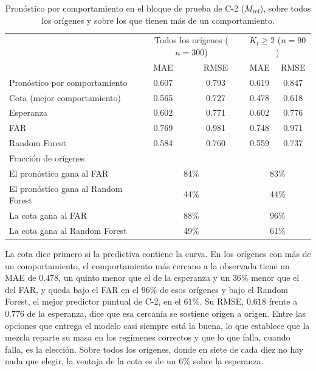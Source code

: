 \begin{table}[H]
\centering\footnotesize
\caption{Pronóstico por comportamiento en el bloque de prueba de C-2 ($M_{\mathrm{ref}}$), sobre todos los orígenes y sobre los que tienen más de un comportamiento.}
\label{tab:res_pronostico}
\begin{tabular}{l cc cc}
\hline
 & \multicolumn{2}{c}{Todos los orígenes ($n = 300$)} & \multicolumn{2}{c}{$K_t \ge 2$ ($n = 90$)} \\
 & MAE & RMSE & MAE & RMSE \\
\hline
Pronóstico por comportamiento  & 0.607 & 0.793 & 0.619 & 0.847 \\
Cota (mejor comportamiento)    & 0.565 & 0.727 & 0.478 & 0.618 \\
Esperanza                      & 0.602 & 0.771 & 0.602 & 0.776 \\
FAR                            & 0.769 & 0.981 & 0.748 & 0.971 \\
Random Forest                  & 0.584 & 0.760 & 0.559 & 0.737 \\
\hline
\multicolumn{5}{l}{Fracción de orígenes} \\
El pronóstico gana al FAR            & \multicolumn{2}{c}{84\%} & \multicolumn{2}{c}{83\%} \\
El pronóstico gana al Random Forest  & \multicolumn{2}{c}{44\%} & \multicolumn{2}{c}{44\%} \\
La cota gana al FAR                  & \multicolumn{2}{c}{88\%} & \multicolumn{2}{c}{96\%} \\
La cota gana al Random Forest        & \multicolumn{2}{c}{49\%} & \multicolumn{2}{c}{61\%} \\
\hline
\end{tabular}
\end{table}

La cota dice primero si la predictiva contiene la curva. En los orígenes con más de un comportamiento, el comportamiento más cercano a la observada tiene un MAE de $0.478$, un quinto menor que el de la esperanza y un $36\%$ menor que el del FAR, y queda bajo el FAR en el $96\%$ de esos orígenes y bajo el Random Forest, el mejor predictor puntual de C-2, en el $61\%$. Su RMSE, $0.618$ frente a $0.776$ de la esperanza, dice que esa cercanía se sostiene origen a origen. Entre las opciones que entrega el modelo casi siempre está la buena, lo que establece que la mezcla reparte su masa en los regímenes correctos y que lo que falla, cuando falla, es la elección. Sobre todos los orígenes, donde en siete de cada diez no hay nada que elegir, la ventaja de la cota es de un $6\%$ sobre la esperanza.\\

